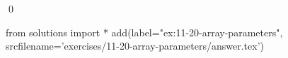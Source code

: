 
\begin{ex}
  \label{ex:11-20-array-parameters}
  
  \qed
\end{ex}
\begin{python0}
from solutions import *
add(label="ex:11-20-array-parameters",
    srcfilename='exercises/11-20-array-parameters/answer.tex')
\end{python0}
